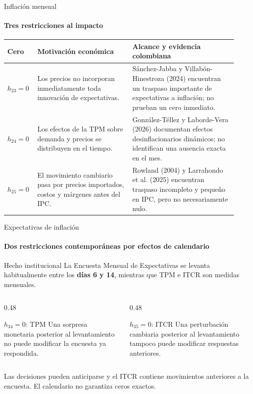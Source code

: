 \documentclass{beamer}
\begin{document}
\begin{frame}{Inflación mensual}
 \framesubtitle{Tres restricciones al impacto}
 \scriptsize
 \renewcommand{\arraystretch}{1.30}
 \begin{tabular}{@{}p{0.105\linewidth}p{0.39\linewidth}p{0.435\linewidth}@{}}
 \toprule
 \textbf{Cero} & \textbf{Motivación económica} & \textbf{Alcance y evidencia colombiana}\\
 \midrule
 $h_{23}=0$ & Los precios no incorporan inmediatamente toda innovación de expectativas. & Sánchez-Jabba y Villabón-Hinestroza (2024) encuentran un traspaso importante de expectativas a inflación; no prueban un cero inmediato.\\
 $h_{24}=0$ & Los efectos de la TPM sobre demanda y precios se distribuyen en el tiempo. & González-Téllez y Laborde-Vera (2026) documentan efectos desinflacionarios dinámicos; no identifican una ausencia exacta en el mes.\\
 $h_{25}=0$ & El movimiento cambiario pasa por precios importados, costos y márgenes antes del IPC. & Rowland (2004) y Larrahondo et al. (2025) encuentran traspaso incompleto y pequeño en IPC, pero no necesariamente nulo.\\
 \bottomrule
 \end{tabular}
 \vfill
\end{frame}

\begin{frame}{Expectativas de inflación}
 \framesubtitle{Dos restricciones contemporáneas por efectos de calendario}
 \begin{block}{Hecho institucional}
  \small La Encuesta Mensual de Expectativas se levanta habitualmente entre los
  \textbf{días 6 y 14}, mientras que TPM e ITCR son medidas mensuales.
 \end{block}
 \vspace{0.2cm}
 \begin{columns}[T]
  \begin{column}{0.48\textwidth}
   \begin{block}{$h_{34}=0$: TPM}
    \small Una sorpresa monetaria posterior al levantamiento no puede modificar
    la encuesta ya respondida.
   \end{block}
  \end{column}
  \begin{column}{0.48\textwidth}
   \begin{block}{$h_{35}=0$: ITCR}
    \small Una perturbación cambiaria posterior al levantamiento tampoco puede
    modificar respuestas anteriores.
   \end{block}
  \end{column}
 \end{columns}
 \vfill
 \begin{alertblock}{}
  \small Las decisiones pueden anticiparse y el ITCR contiene movimientos
  \alert{anteriores} a la encuesta. El calendario no garantiza ceros exactos.
 \end{alertblock}
\end{frame}
\end{document}
